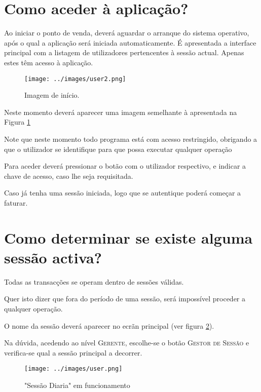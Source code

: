 \documentclass[a4paper,11pt,openany]{memoir}
\begin{document}
\section{Como aceder à aplicação?}

Ao iniciar o ponto de venda, deverá aguardar o arranque do sistema operativo, após
o qual a aplicação será iniciada automaticamente. É apresentada a interface
principal com a listagem de utilizadores pertencentes à sessão actual. Apenas estes
têm acesso à aplicação.


\begin{figure}
\begin{center}
\texttt{[image: ../images/user2.png]}
\caption[Submanifold]{Imagem de início.}
\label{welcomeScreen}
\end{center}
\end{figure}


Neste momento deverá aparecer uma imagem semelhante à apresentada na Figura \ref{welcomeScreen}

Note que neste momento todo programa está com acesso restringido, obrigando a que 
o utilizador se identifique para que possa executar qualquer operação
	
Para aceder deverá pressionar o botão com o utilizador respectivo, e indicar a chave
de acesso, caso lhe seja requisitada.


Caso já tenha uma sessão iniciada, logo que se autentique poderá começar a faturar.



\section{Como determinar se existe alguma sessão activa?}



Todas as transacções se operam dentro de sessões válidas.

Quer isto dizer que fora do período de uma sessão, será impossível proceder a qualquer operação.


O nome da sessão deverá aparecer no ecrãn principal (ver figura \ref{userlogged}).

Na dúvida, acedendo ao nível \textsc{Gerente}, escolhe-se o botão \textsc{Gestor de Sessão} e verifica-se qual
a sessão principal a decorrer.

\begin{figure}
\begin{center}
\texttt{[image: ../images/user.png]}
\caption[Submanifold]{"Sessão Diaria" em funcionamento}
\label{userlogged}
\end{center}
\end{figure}
\end{document}
